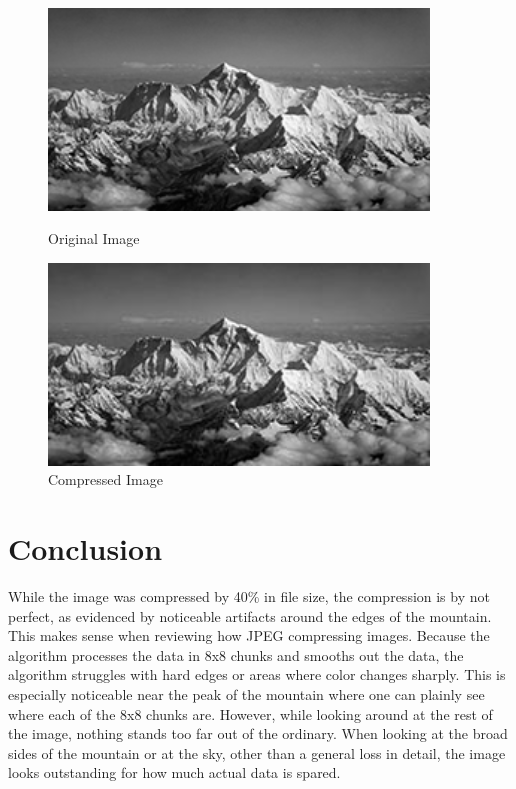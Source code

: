 \documentclass[11pt]{article}
\begin{document}
\begin{figure}
  \centering
  \begin{minipage}{0.45\textwidth}
      \centering
      \includegraphics[width=0.9\textwidth]{./images/original.jpg}
      \caption{Original Image}
      \label{fig:original}
  \end{minipage}\hfill
  \begin{minipage}{0.45\textwidth}
      \centering
      \includegraphics[width=0.9\textwidth]{./images/compressed50.jpg}
      \caption{Compressed Image}
      \label{fig:compressed}
  \end{minipage}
\end{figure}

\section{Conclusion}
\label{sec: conclusion}

While the image was compressed by 40\% in file size, the compression is by not perfect, as evidenced by noticeable artifacts around the edges of the mountain.
This makes sense when reviewing how JPEG compressing images.
Because the algorithm processes the data in 8x8 chunks and smooths out the data, the algorithm struggles with hard edges or areas where color changes sharply.
This is especially noticeable near the peak of the mountain where one can plainly see where each of the 8x8 chunks are.
However, while looking around at the rest of the image, nothing stands too far out of the ordinary.
When looking at the broad sides of the mountain or at the sky, other than a general loss in detail, the image looks outstanding for how much actual data is spared.
\end{document}
